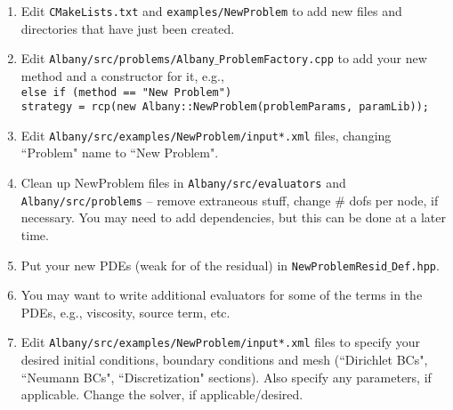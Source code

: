 \documentclass[11pt]{article}
\begin{document}
\begin{enumerate}
\item Edit {\tt CMakeLists.txt} and {\tt examples/NewProblem} 
to add new files and directories that have just been created.
\item  Edit {\tt Albany/src/problems/Albany}$\_${\tt ProblemFactory.cpp} to add your new method and a constructor for it, e.g.,\\ 
{\tt else if (method == "New Problem") }\\
{\tt    strategy = rcp(new Albany::NewProblem(problemParams, paramLib));}
\item Edit {\tt Albany/src/examples/NewProblem/input*.xml} files, changing ``Problem" name to ``New Problem". 
\item Clean up NewProblem files in {\tt Albany/src/evaluators} and {\tt Albany/src/problems} -- remove extraneous stuff, change \# dofs per node, if necessary.  You may need to add dependencies, but this can be done at a later time.  
\item Put your new PDEs (weak for of the residual) in {\tt NewProblemResid}$\_${\tt Def.hpp}.  
\item You may want to write additional evaluators for some of the terms in the PDEs, e.g., viscosity, source term, etc.
\item Edit {\tt Albany/src/examples/NewProblem/input*.xml} files to specify your desired initial conditions, boundary conditions and mesh 
(``Dirichlet BCs", ``Neumann BCs", ``Discretization" sections).  Also specify any parameters, if applicable.  Change the solver, if applicable/desired.  
\end{enumerate}
\end{document}

